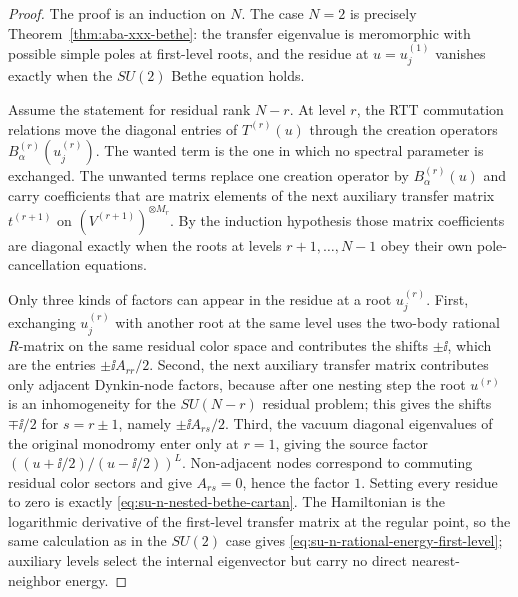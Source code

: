 \begin{proof}
The proof is an induction on \(N\).  The case \(N=2\) is precisely
Theorem~\ref{thm:aba-xxx-bethe}: the transfer eigenvalue is meromorphic with
possible simple poles at first-level roots, and the residue at
\(u=u_j^{(1)}\) vanishes exactly when the \(SU(2)\) Bethe equation holds.

Assume the statement for residual rank \(N-r\).  At level \(r\), the RTT
commutation relations move the diagonal entries of \(T^{(r)}(u)\) through the
creation operators \(B^{(r)}_\alpha(u_j^{(r)})\).  The wanted term is the one
in which no spectral parameter is exchanged.  The unwanted terms replace one
creation operator by \(B^{(r)}_\alpha(u)\) and carry coefficients that are
matrix elements of the next auxiliary transfer matrix \(t^{(r+1)}\) on
\((V^{(r+1)})^{\otimes M_r}\).  By the induction hypothesis those matrix
coefficients are diagonal exactly when the roots at levels
\(r+1,\ldots,N-1\) obey their own pole-cancellation equations.

Only three kinds of factors can appear in the residue at a root
\(u_j^{(r)}\).  First, exchanging \(u_j^{(r)}\) with another root at the same
level uses the two-body rational \(R\)-matrix on the same residual color
space and contributes the shifts \(\pm\ii\), which are the entries
\(\pm\ii A_{rr}/2\).  Second, the next auxiliary transfer matrix contributes
only adjacent Dynkin-node factors, because after one nesting step the root
\(u^{(r)}\) is an inhomogeneity for the \(SU(N-r)\) residual problem; this
gives the shifts \(\mp\ii/2\) for \(s=r\pm1\), namely
\(\pm\ii A_{rs}/2\).  Third, the vacuum diagonal eigenvalues of the original
monodromy enter only at \(r=1\), giving the source factor
\(((u+\ii/2)/(u-\ii/2))^L\).  Non-adjacent nodes correspond to commuting
residual color sectors and give \(A_{rs}=0\), hence the factor \(1\).
Setting every residue to zero is exactly
\eqref{eq:su-n-nested-bethe-cartan}.  The Hamiltonian is the logarithmic
derivative of the first-level transfer matrix at the regular point, so the
same calculation as in the \(SU(2)\) case gives
\eqref{eq:su-n-rational-energy-first-level}; auxiliary levels select the
internal eigenvector but carry no direct nearest-neighbor energy.
\end{proof}

